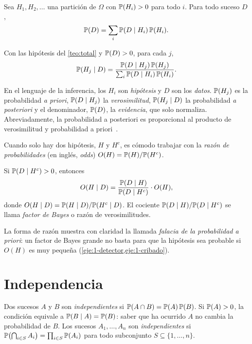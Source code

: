 \begin{teorema}\label{teo:total}
Sea $H_1,H_2,\dots$ una partición de $\Omega$ con $\mathbb{P}(H_i)>0$ para todo $i$. Para todo suceso $D$,
\[
\mathbb{P}(D)=\sum_{i}\mathbb{P}(D\mid H_i)\,\mathbb{P}(H_i).
\]
\end{teorema}

\begin{teorema}\label{teo:bayes}
Con las hipótesis del \cref{teo:total} y $\mathbb{P}(D)>0$, para cada $j$,
\[
\mathbb{P}(H_j\mid D)=\frac{\mathbb{P}(D\mid H_j)\,\mathbb{P}(H_j)}{\sum_{i}\mathbb{P}(D\mid H_i)\,\mathbb{P}(H_i)}.
\]
\end{teorema}

En el lenguaje de la inferencia, los $H_i$ son \emph{hipótesis} y $D$ son los \emph{datos}. $\mathbb{P}(H_j)$ es la probabilidad \emph{a priori}, $\mathbb{P}(D\mid H_j)$ la \emph{verosimilitud}, $\mathbb{P}(H_j\mid D)$ la probabilidad \emph{a posteriori} y el denominador, $\mathbb{P}(D)$, la \emph{evidencia}, que solo normaliza. Abreviadamente, la probabilidad a posteriori es proporcional al producto de verosimilitud y probabilidad a priori~\cite[clase~11]{mit1805}.

\addtocounter{definicion}{1}%

\addtocounter{figure}{1}%

Cuando solo hay dos hipótesis, $H$ y $H^{c}$, es cómodo trabajar con la \emph{razón de probabilidades} (en inglés, \emph{odds}) $O(H)=\mathbb{P}(H)/\mathbb{P}(H^{c})$.

\begin{proposicion}\label{prop:odds}
Si $\mathbb{P}(D\mid H^{c})>0$, entonces
\[
O(H\mid D)=\frac{\mathbb{P}(D\mid H)}{\mathbb{P}(D\mid H^{c})}\cdot O(H),
\]
donde $O(H\mid D)=\mathbb{P}(H\mid D)/\mathbb{P}(H^{c}\mid D)$. El cociente $\mathbb{P}(D\mid H)/\mathbb{P}(D\mid H^{c})$ se llama \emph{factor de Bayes} o razón de verosimilitudes.
\end{proposicion}

La forma de razón muestra con claridad la llamada \emph{falacia de la probabilidad a priori}: un factor de Bayes grande no basta para que la hipótesis sea probable si $O(H)$ es muy pequeña (\cref{eje:1-detector,eje:1-cribado}).

\section{Independencia}

\begin{definicion}[Independencia]\label{def:indep}
Dos sucesos $A$ y $B$ son \emph{independientes} si $\mathbb{P}(A\cap B)=\mathbb{P}(A)\,\mathbb{P}(B)$. Si $\mathbb{P}(A)>0$, la condición equivale a $\mathbb{P}(B\mid A)=\mathbb{P}(B)$: saber que ha ocurrido $A$ no cambia la probabilidad de $B$. Los sucesos $A_1,\dots,A_n$ son \emph{independientes} si $\mathbb{P}\bigl(\bigcap_{i\in S}A_i\bigr)=\prod_{i\in S}\mathbb{P}(A_i)$ para todo subconjunto $S\subseteq\{1,\dots,n\}$.
\end{definicion}

